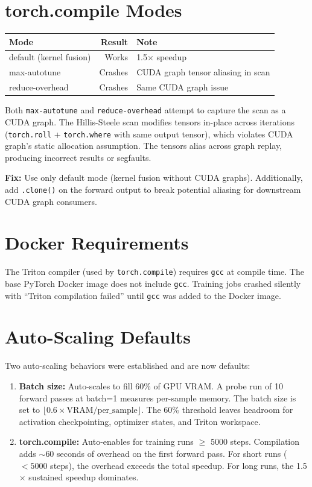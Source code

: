 \documentclass[11pt,a4paper]{report}
\begin{document}
\section{torch.compile Modes}

\begin{center}
\begin{tabular}{lrl}
\toprule
Mode & Result & Note \\
\midrule
default (kernel fusion) & Works & 1.5$\times$ speedup \\
max-autotune & Crashes & CUDA graph tensor aliasing in scan \\
reduce-overhead & Crashes & Same CUDA graph issue \\
\bottomrule
\end{tabular}
\end{center}

Both \texttt{max-autotune} and \texttt{reduce-overhead} attempt to capture the scan as a CUDA graph. The Hillis-Steele scan modifies tensors in-place across iterations (\texttt{torch.roll} + \texttt{torch.where} with same output tensor), which violates CUDA graph's static allocation assumption. The tensors alias across graph replay, producing incorrect results or segfaults.

\textbf{Fix:} Use only default mode (kernel fusion without CUDA graphs). Additionally, add \texttt{.clone()} on the forward output to break potential aliasing for downstream CUDA graph consumers.

\section{Docker Requirements}

The Triton compiler (used by \texttt{torch.compile}) requires \texttt{gcc} at compile time. The base PyTorch Docker image does not include \texttt{gcc}. Training jobs crashed silently with ``Triton compilation failed'' until \texttt{gcc} was added to the Docker image.

\section{Auto-Scaling Defaults}

Two auto-scaling behaviors were established and are now defaults:

\begin{enumerate}[nosep]
\item \textbf{Batch size:} Auto-scales to fill 60\% of GPU VRAM. A probe run of 10 forward passes at batch=1 measures per-sample memory. The batch size is set to $\lfloor 0.6 \times \text{VRAM} / \text{per\_sample} \rfloor$. The 60\% threshold leaves headroom for activation checkpointing, optimizer states, and Triton workspace.

\item \textbf{torch.compile:} Auto-enables for training runs $\geq$ 5000 steps. Compilation adds $\sim$60 seconds of overhead on the first forward pass. For short runs ($< 5000$ steps), the overhead exceeds the total speedup. For long runs, the 1.5$\times$ sustained speedup dominates.
\end{enumerate}
\end{document}
